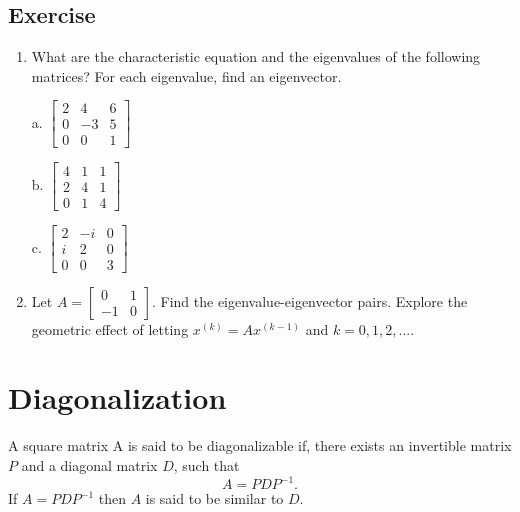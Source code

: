 \documentclass[aima104_lecturenotes_ku.tex]{subfiles}
\begin{document}
\subsection{Exercise}
\begin{enumerate}
\item What are the characteristic equation and the eigenvalues of the following matrices? For each eigenvalue, find an eigenvector.
  \begin{multicols}{3}
    a. $\begin{bmatrix}
      2 & 4 & 6 \\
      0 & -3 & 5 \\
      0 & 0 & 1
    \end{bmatrix}$

    \columnbreak

    b. $\begin{bmatrix}
      4 & 1 & 1 \\
      2 & 4 & 1 \\
      0 & 1 & 4
    \end{bmatrix}$
    \columnbreak

    c. $\begin{bmatrix}
      2 & -i & 0 \\
      i & 2 & 0 \\
      0 & 0 & 3
    \end{bmatrix}$
  \end{multicols}

\item Let $A= \begin{bmatrix}
  0 & 1 \\
  -1 & 0
\end{bmatrix}$. Find the eigenvalue-eigenvector pairs. Explore the geometric effect of letting $\displaystyle x^{(k)}=Ax^{(k-1)}$ and $k=0,1,2,...$.
\end{enumerate}

\section{Diagonalization}
\begin{mdframed}
  A square matrix A is said to be diagonalizable if, there exists an invertible matrix $P$ and a diagonal matrix $D$, such that $$A = PDP^{-1}.$$ If $A = PDP^{-1}$ then $A$ is said to be similar to $D$.
\end{mdframed}
\end{document}
